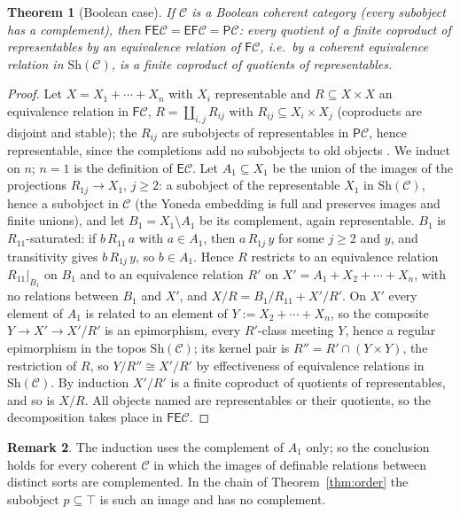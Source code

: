 \documentclass[11pt]{amsart}
\newtheorem{thm}{Theorem}[section]
\theoremstyle{definition}
\newtheorem{rem}[thm]{Remark}
\newcommand{\Sh}{\mathrm{Sh}}
\newcommand{\FF}{\mathsf F}
\newcommand{\EE}{\mathsf E}
\newcommand{\PP}{\mathsf P}
\newcommand{\cC}{\mathcal C}
\begin{document}
\begin{thm}[Boolean case]\label{thm:boolean}
If $\cC$ is a Boolean coherent category (every subobject has a
complement), then $\FF\EE\cC=\EE\FF\cC=\PP\cC$: every quotient of a finite
coproduct of representables by an equivalence relation of $\FF\cC$, i.e.\
by a coherent equivalence relation in $\Sh(\cC)$, is a finite
coproduct of quotients of representables.
\end{thm}
\begin{proof}
Let $X=X_1+\cdots+X_n$ with $X_i$ representable and $R\subseteq X\times
X$ an equivalence relation in $\FF\cC$, $R=\coprod_{i,j}R_{ij}$ with
$R_{ij}\subseteq X_i\times X_j$ (coproducts are disjoint and stable);
the $R_{ij}$ are subobjects of representables in $\PP\cC$, hence
representable, since the completions add no subobjects to old objects
\cite{CV98}. We
induct on $n$; $n=1$ is the definition of $\EE\cC$. Let $A_1\subseteq
X_1$ be the union of the images of the projections $R_{1j}\to X_1$,
$j\ge2$: a subobject of the representable $X_1$ in $\Sh(\cC)$, hence a
subobject in $\cC$ (the Yoneda embedding is full and preserves images
and finite unions), and let $B_1=X_1\setminus A_1$ be its complement,
again representable. $B_1$ is $R_{11}$-saturated: if $b\,R_{11}\,a$ with
$a\in A_1$, then $a\,R_{1j}\,y$ for some $j\ge2$ and $y$, and transitivity
gives $b\,R_{1j}\,y$, so $b\in A_1$. Hence $R$ restricts to an
equivalence relation $R_{11}|_{B_1}$ on $B_1$ and to an equivalence
relation $R'$ on $X'=A_1+X_2+\cdots+X_n$, with no relations between
$B_1$ and $X'$, and $X/R=B_1/R_{11}+X'/R'$. On $X'$ every element of
$A_1$ is related to an element of $Y:=X_2+\cdots+X_n$, so the composite
$Y\to X'\to X'/R'$ is an epimorphism, every $R'$-class meeting $Y$, hence
a regular epimorphism in the topos $\Sh(\cC)$; its kernel pair is
$R''=R'\cap(Y\times Y)$, the restriction of $R$, so $Y/R''\cong X'/R'$
by effectiveness of equivalence relations in $\Sh(\cC)$. By induction
$X'/R'$ is a
finite coproduct of quotients of representables, and so is $X/R$. All
objects named are representables or their quotients, so the
decomposition takes place in $\FF\EE\cC$.
\end{proof}

\begin{rem}
The induction uses the complement of $A_1$ only; so the conclusion holds
for every coherent $\cC$ in which the images of definable relations
between distinct sorts are complemented. In the chain of
Theorem~\ref{thm:order} the subobject $p\subseteq\top$ is such an image
and has no complement.
\end{rem}
\end{document}
